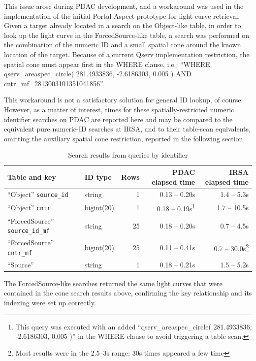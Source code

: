 \documentclass[DM,lsstdraft,STR,toc]{lsstdoc}
\begin{document}
This issue arose during PDAC development,
and a workaround was used in the implementation of the initial Portal Aspect prototype for light curve retrieval.
Given a target already located in a search on the Object-like table,
in order to look up the light curve in the ForcedSource-like table, 
a search was performed on the combination of the numeric ID and a small spatial cone around the known location of the target.
Because of a current Qserv implementation restriction,
the spatial cone must appear first in the WHERE clause, i.e.:
``WHERE qserv\_areaspec\_circle( 281.4933836, -2.6186303, 0.005 ) AND cntr\_mf=2813003101351041856''.

This workaround is not a satisfactory solution for general ID lookup, of course.
However, as a matter of interest,
times for these spatially-restricted numeric identifier searches on PDAC are reported here and may be compared to the equivalent pure numeric-ID searches at IRSA,
and to their table-scan equivalents, omitting the auxiliary spatial cone restriction,
reported in the following section.

\begin{table}[h]
\centering
\begin{tabular}{l l r r r}
Table and key & ID type & Rows & PDAC elapsed time & IRSA elapsed time \\ \hline
``Object'' \verb|source_id| & string & 1 & 0.13 -- 0.20s & 1.4 -- 5.3s \\
``Object'' \verb|cntr| & bigint(20) & 1 & 0.18 -- 0.19s\footnote{This query was executed with an added ``qserv\_areaspec\_circle( 281.4933836, -2.6186303, 0.005 )'' in the WHERE clause to avoid triggering a table scan.\label{fn:id-no-table-scan}} & 1.7 -- 10.5s \\
``ForcedSource'' \verb|source_id_mf| & string & 25 & 0.18 -- 0.20s & 0.7 -- 4.5s \\
``ForcedSource'' \verb|cntr_mf| & bigint(20) & 25 & 0.11 -- 0.41s\footnotemark[4] & 0.7 -- 30.0s\footnote{Most results were in the 2.5--3s range; 30s times appeared a few time } \\
``Source'' & string & 1 & 0.18 -- 0.21s & 1.5 -- 5.2s \\
\end{tabular}
\caption{Search results from queries by identifier}
\label{tab:conesyntax}
\end{table}

The ForcedSource-like searches returned the same light curves that were contained in the cone search results above, confirming the key relationship and its indexing were set up correctly.
\end{document}
